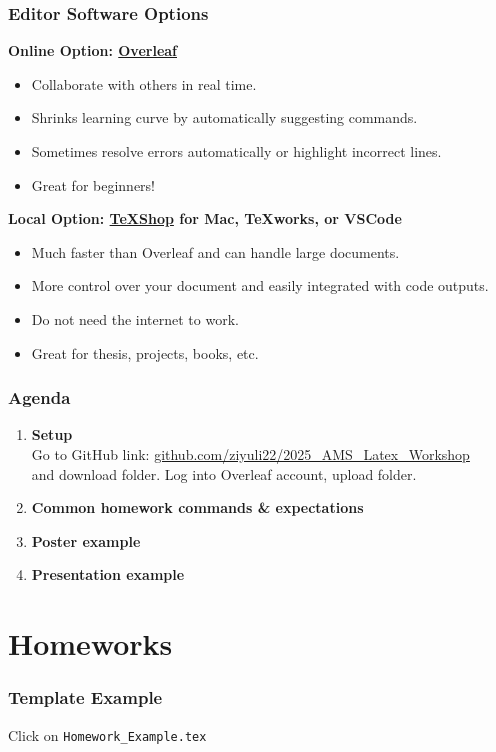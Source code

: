 \documentclass[serif,12pt, aspectratio=169]{beamer}
\begin{document}
\begin{frame}
	\frametitle{Editor Software Options}
	\pause
	\textbf{Online Option: \href{http://www.overleaf.com}{Overleaf}}
	\pause
	\begin{itemize}
		\item Collaborate with others in real time. 
		\pause
		\item Shrinks learning curve by automatically suggesting commands. 
		\pause
		\item Sometimes resolve errors automatically or highlight incorrect lines.
		\pause
		\item Great for beginners!
	\end{itemize}
	\pause
	\textbf{Local Option: \href{https://pages.uoregon.edu/koch/texshop/installingtexshop.html}{TeXShop} for Mac, TeXworks, or VSCode}
	\pause
	\begin{itemize}
		\item Much faster than Overleaf and can handle large documents. 
		\pause
		\item More control over your document and easily integrated with code outputs. 
		\pause
		\item Do not need the internet to work. 
		\pause
		\item Great for thesis, projects, books, etc. 
	\end{itemize}
\end{frame}


\begin{frame}
	\frametitle{Agenda}
	\pause
	\begin{enumerate}
		\item \textbf{Setup} \\
		Go to GitHub link: \url{github.com/ziyuli22/2025_AMS_Latex_Workshop} \\
		and download folder. Log into Overleaf account, upload folder. 
		\item \textbf{Common homework commands \& expectations}
		\item \textbf{Poster example}
		\item \textbf{Presentation example}
	\end{enumerate}
\end{frame}


\section{Homeworks}
\begin{frame}
	\frametitle{Template Example}
	\centering
	{\Large Click on \texttt{Homework\_Example.tex}}
\end{frame}
\end{document}

